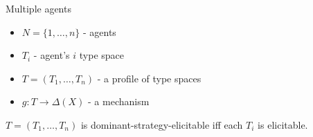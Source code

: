 %
%
%
%
%
%
%
%
%
%
%
%
%
%
%
%

\begin{frame}{Multiple agents}{}

\begin{itemize}
\item $N=\{1,\ldots,n\}$ - agents

\item $T_i$ - agent's $i$ type space

\item $T=(T_1,\ldots,T_n)$ - a profile of type spaces

\item $g:T\to \Delta(X)$ - a mechanism
\end{itemize}
%
%

\pause

\medskip

\begin{proposition}
$T=(T_1,\ldots,T_n)$ is dominant-strategy-elicitable iff each $T_i$ is elicitable.
\end{proposition}

\bigskip

\end{frame}

